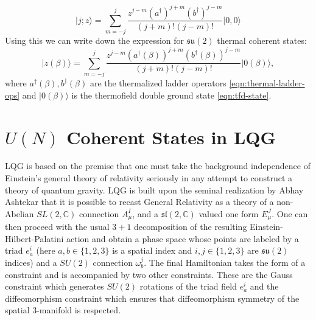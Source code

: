 \documentclass[twocolumn,draft,aps,nofootinbib,nobibnotes,final]{revtex4-2}
\newcommand{\C}{\mathbb{C}}
\newcommand{\mf}[1]{\mathfrak{#1}}
\newcommand{\ket}[1]{\vert #1 \rangle}
\newcommand{\sltwoc}{\mathfrak{sl}(2,\mathbb{C})}
\begin{document}
\begin{equation}\label{eqn:su2-coherent-state-2}
	\ket{j;z} = \sum_{m=-j}^{j} \frac{z^{j-m} (a^\dagger)^{j+m} (b^\dagger)^{j-m}}{(j+m)! (j-m)!} \ket{0,0}
\end{equation}
Using this we can write down the expression for $ \mf{su}(2) $ thermal coherent states:
\begin{equation}\label{eqn:su2-thermal-coherent-state}
	\ket{z(\beta)} = \sum_{m=-j}^{j} \frac{z^{j-m} (a^\dagger(\beta))^{j+m} (b^\dagger(\beta))^{j-m}}{(j+m)! (j-m)!} \ket{0(\beta)},
\end{equation}
where $ a^\dagger(\beta), b^\dagger(\beta) $ are the thermalized ladder operators \eqref{eqn:thermal-ladder-ops} and $ \ket{0(\beta)} $ is the thermofield double ground state \eqref{eqn:tfd-state}.



\section{$ U(N) $ Coherent States in LQG}\label{sec:u-n-coherent-states}

LQG is based on the premise that one must take the background independence of Einstein's general theory of relativity seriously in any attempt to construct a theory of quantum gravity. LQG is built upon the seminal realization by Abhay Ashtekar that it is possible to recast General Relativity as a theory of a non-Abelian $ SL(2,\C) $ connection $ A_\mu^I $, and a $ \sltwoc $ valued one form $ E_\mu^J $. One can then proceed with the usual $ 3+1 $ decomposition of the resulting Einstein-Hilbert-Palatini action and obtain a phase space whose points are labeled by a triad $ e_a^i $ (here $ a,b \in \{1,2,3\}$ is a spatial index and $ i,j \in \{1,2,3\} $ are $ \mf{su}(2) $ indices) and a $ SU(2) $ connection $ \omega_b^j $. The final Hamiltonian takes the form of a constraint and is accompanied by two other constraints. These are the Gauss constraint
which generates $ SU(2) $ rotations of the triad field $ e_a^i $ and the diffeomorphism constraint which ensures that diffeomorphism symmetry of the spatial 3-manifold is respected.
\end{document}
